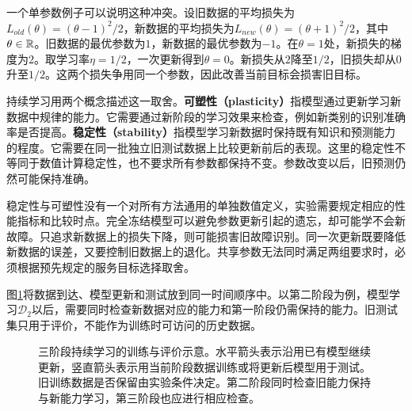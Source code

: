 一个单参数例子可以说明这种冲突。设旧数据的平均损失为$L_{old}(\theta)=(\theta-1)^2/2$，新数据的平均损失为$L_{new}(\theta)=(\theta+1)^2/2$，其中$\theta\in\mathbb{R}$。旧数据的最优参数为$1$，新数据的最优参数为$-1$。在$\theta=1$处，新损失的梯度为$2$。取学习率$\eta=1/2$，一次更新得到$\theta=0$。新损失从$2$降至$1/2$，旧损失却从$0$升至$1/2$。这两个损失争用同一个参数，因此改善当前目标会损害旧目标。

持续学习用两个概念描述这一取舍。\textbf{可塑性（plasticity）}指模型通过更新学习新数据中规律的能力。它需要通过新阶段的学习效果来检查，例如新类别的识别准确率是否提高。\textbf{稳定性（stability）}指模型学习新数据时保持既有知识和预测能力的程度。它需要在同一批独立旧测试数据上比较更新前后的表现。这里的稳定性不等同于数值计算稳定性，也不要求所有参数都保持不变。参数改变以后，旧预测仍然可能保持准确。

稳定性与可塑性没有一个对所有方法通用的单独数值定义，实验需要规定相应的性能指标和比较时点。完全冻结模型可以避免参数更新引起的遗忘，却可能学不会新故障。只追求新数据上的损失下降，则可能损害旧故障识别。同一次更新既要降低新数据的误差，又要控制旧数据上的退化。共享参数无法同时满足两组要求时，必须根据预先规定的服务目标选择取舍。

图\ref{fig:continual-stability-plasticity}将数据到达、模型更新和测试放到同一时间顺序中。以第二阶段为例，模型学习$\mathcal D_2$以后，需要同时检查新数据对应的能力和第一阶段仍需保持的能力。旧测试集只用于评价，不能作为训练时可访问的历史数据。
\begin{figure}[htbp]
\centering
{}
\caption{三阶段持续学习的训练与评价示意。水平箭头表示沿用已有模型继续更新，竖直箭头表示用当前阶段数据训练或将更新后模型用于测试。旧训练数据是否保留由实验条件决定。第二阶段同时检查旧能力保持与新能力学习，第三阶段也应进行相应检查。}
\label{fig:continual-stability-plasticity}
\end{figure}

